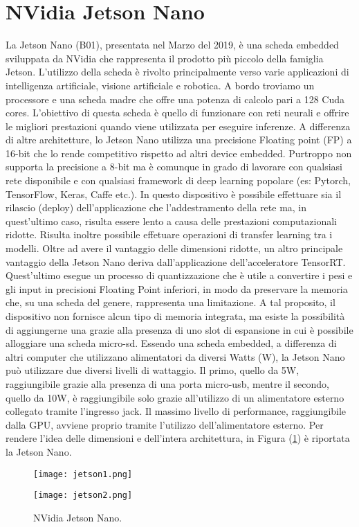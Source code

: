 \section{NVidia Jetson Nano}
La Jetson Nano (B01), presentata nel Marzo del 2019,  è una scheda embedded 
sviluppata da NVidia che rappresenta il prodotto più piccolo della 
famiglia Jetson. L'utilizzo della scheda è rivolto principalmente verso varie 
applicazioni di intelligenza artificiale, visione artificiale e robotica. A bordo 
troviamo un processore e una scheda madre che offre una potenza di calcolo 
pari a 128 Cuda cores. L'obiettivo di questa scheda è quello di funzionare 
con reti neurali e offrire le migliori prestazioni quando viene utilizzata per 
eseguire inferenze. A differenza di altre architetture, lo Jetson Nano utilizza 
una precisione Floating point (FP) a 16-bit che lo rende competitivo rispetto 
ad altri device embedded. Purtroppo non supporta la precisione a 8-bit 
ma è comunque in grado di lavorare con qualsiasi rete disponibile e con 
qualsiasi framework di deep learning popolare (es: Pytorch, TensorFlow, 
Keras, Caffe etc.). In questo dispositivo è possibile effettuare sia il rilascio 
(deploy) dell'applicazione che l'addestramento della rete ma, in quest'ultimo 
caso, risulta essere lento a causa delle prestazioni computazionali ridotte. 
Risulta inoltre possibile effetuare operazioni di transfer learning tra i modelli.
Oltre ad avere il vantaggio delle dimensioni ridotte, un altro principale vantaggio 
della Jetson Nano deriva dall'applicazione dell'acceleratore TensorRT. 
Quest'ultimo esegue un processo di quantizzazione che è utile a convertire i 
pesi e gli input in precisioni Floating Point inferiori, in modo da preservare 
la memoria che, su una scheda del genere, rappresenta una limitazione. A 
tal proposito, il dispositivo non fornisce alcun tipo di memoria integrata, 
ma esiste la possibilità di aggiungerne una grazie alla presenza di uno slot 
di espansione in cui è possibile alloggiare una scheda micro-sd. Essendo una 
scheda embedded, a differenza di altri computer che utilizzano alimentatori 
da diversi Watts (W), la Jetson Nano può utilizzare due diversi livelli di 
wattaggio. Il primo, quello da 5W, raggiungibile grazie alla presenza di 
una porta micro-usb, mentre il secondo, quello da 10W, è raggiungibile solo 
grazie all'utilizzo di un alimentatore esterno collegato tramite l'ingresso 
jack. Il massimo livello di performance, raggiungibile dalla GPU, avviene 
proprio tramite l'utilizzo dell'alimentatore esterno. Per rendere l'idea delle 
dimensioni e dell'intera architettura, in Figura (\ref{jetson}) è riportata la Jetson 
Nano.
\begin{figure}[]
    \begin{minipage}[t]{.45\textwidth}
        \centering
        \texttt{[image: jetson1.png]}
    \end{minipage}
    \hfill
    \begin{minipage}[t]{.45\textwidth}
        \centering
        \texttt{[image: jetson2.png]}
    \end{minipage}  
    \caption{NVidia Jetson Nano.}
    \label{jetson}
\end{figure}

